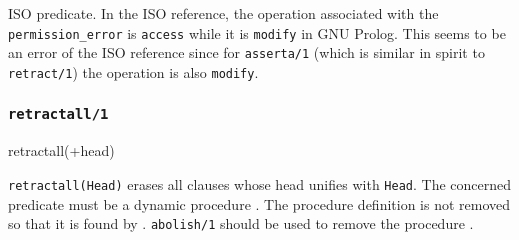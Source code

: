 \begin{PlErrors}




\end{PlErrors}

\Portability

ISO predicate. In the ISO reference, the operation associated with the
\texttt{permission\_error} is \texttt{access} while it is \texttt{modify} in
GNU Prolog. This seems to be an error of the ISO reference since for
\texttt{asserta/1} (which is similar in spirit to \texttt{retract/1}) the
operation is also \texttt{modify}.

\subsubsection{\texttt{retractall/1}}

\begin{TemplatesOneCol}
retractall(+head)

\end{TemplatesOneCol}

\Description

\texttt{retractall(Head)} erases all clauses whose head unifies with
\texttt{Head}. The concerned predicate must be a dynamic procedure
. The procedure definition
is not removed so that it is found by 
. \texttt{abolish/1} should be used to remove the
procedure .

\begin{PlErrors}




\end{PlErrors}

